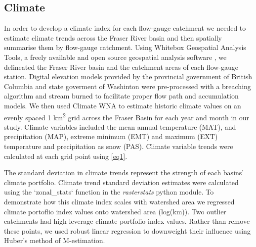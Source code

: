 \documentclass[9pt,twocolumn,twoside,lineno]{pnas-new}
\begin{document}
{\subsection*{Climate} In order to develop a climate index for each flow-gauge catchment we needed to estimate climate trends across the Fraser River basin and then spatially summarise them by flow-gauge catchment. Using Whitebox Geospatial Analysis Tools, a freely available and open source geospatial analysis software \citep{}, we delineated the Fraser River basin and the catchment areas of each flow-gauge station. Digital elevation models provided by the provincial government of British Columbia and state goverment of Washinton were pre-processed with a breaching algorithm and stream burned to facilitate proper flow path and accumulation models. We then used Climate WNA to estimate historic climate values on an evenly spaced 1 km\textsuperscript{2} grid across the Fraser Basin for each year and month in our study. Climate variables included the mean annual temperature (MAT), and precipitation (MAP), extreme minimum (EMT) and maximum (EXT) temperature and precipitation as snow (PAS). Climate variable trends were calculated at each grid point using \ref{eq1}.

The standard deviation in climate trends represent the strength of each basins' climate portfolio. Climate trend standard deviation estimates were calculated using the `zonal\_stats` function in the \textit{rasterstats} python module. To demonstrate how this climate index scales with watershed area we regressed climate portoflio index values onto watershed area (log(km)). Two outlier catchments had high leverage climate portfolio index values. Rather than remove these points, we used robust linear regression to downweight their influence using Huber's method of M-estimation. 

\showmatmethods %

}
\end{document}
